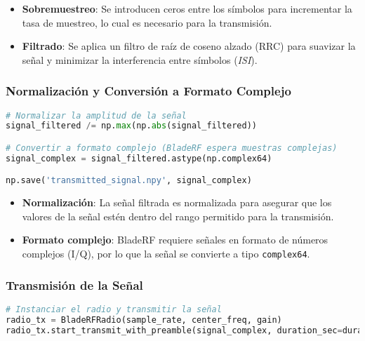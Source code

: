 \documentclass[letterpaper,12pt,oneside]{article}
\begin{document}
\begin{itemize}
    \item \textbf{Sobremuestreo}: Se introducen ceros entre los símbolos para incrementar la tasa de muestreo, lo cual es necesario para la transmisión.
    \item \textbf{Filtrado}: Se aplica un filtro de raíz de coseno alzado (RRC) para suavizar la señal y minimizar la interferencia entre símbolos (\textit{ISI}).
\end{itemize}

\subsubsection*{Normalización y Conversión a Formato Complejo}

\begin{tcolorbox}[title=\textbf{Normalización y Conversión a Formato Complejo}, colframe=black, colback=white]
\begin{lstlisting}[language=Python]
# Normalizar la amplitud de la señal
signal_filtered /= np.max(np.abs(signal_filtered))

# Convertir a formato complejo (BladeRF espera muestras complejas)
signal_complex = signal_filtered.astype(np.complex64)

np.save('transmitted_signal.npy', signal_complex)
\end{lstlisting}
\end{tcolorbox}

\begin{itemize}
    \item \textbf{Normalización}: La señal filtrada es normalizada para asegurar que los valores de la señal estén dentro del rango permitido para la transmisión.
    \item \textbf{Formato complejo}: BladeRF requiere señales en formato de números complejos (I/Q), por lo que la señal se convierte a tipo \texttt{complex64}.
\end{itemize}

\subsubsection*{Transmisión de la Señal}

\begin{tcolorbox}[title=\textbf{Transmisión de la Señal}, colframe=black, colback=white]
\begin{lstlisting}[language=Python]
# Instanciar el radio y transmitir la señal
radio_tx = BladeRFRadio(sample_rate, center_freq, gain)
radio_tx.start_transmit_with_preamble(signal_complex, duration_sec=duration_sec)
\end{lstlisting}
\end{tcolorbox}
\end{document}
